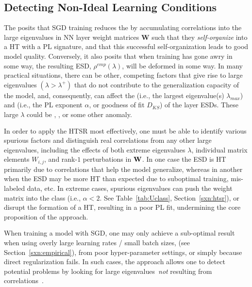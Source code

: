 \subsection{Detecting Non-Ideal Learning Conditions}
\label{sxn:HT_ESDs}


The \HTSR \Phenomenology posits that SGD training reduces the \emph{\TrainingError} by accumulating correlations into the large eigenvalues
in NN layer weight matrices  $\mathbf{W}$ such that they \emph{self-organize} into a HT with a PL signature,
and that this successful self-organization leads to good model quality.
Conversely, it also posits that when training has gone awry in some way, the resulting ESD, $\rho^{emp}(\lambda)$, will
be deformed in some way.   
In many practical situations, there can be other, 
competing factors that give rise to large eigenvalues $(\lambda>\lambda^{+})$
that do not contribute to the generalization capacity of the model, and, consequently, 
can affect the \Scale (i.e., the largest eigenvalue(s) $\lambda_{max}$) 
and \Shape (i.e., the PL exponent $\alpha$, or goodness of fit $D_{KS}$) of the layer ESDs.
These large $\lambda$ could be \DragonKings, \emph{\CorrelationTraps}, or some other anomaly.

In order to apply the HTSR \Phenomenology most effectively, one must be able to identify various spurious factors and
distinguish real correlations from any other large eigenvalues, including the effects of both
extreme eigenvalues $\lambda$, individual matrix elements $W_{i,j}$, and rank-$1$ perturbations in ${\mathbf{W}}$.
In one case the ESD is HT primarily due to correlations that help the model generalize, whereas
in another when the ESD may be more HT than expected due to suboptimal training, mis-labeled data, etc.
In extreme cases, spurious eigenvalues can push the weight matrix
into the \VeryHeavyTailed \Universality class (i.e., $\alpha<2$. See Table~\ref{tab:Uclass}, Section~\ref{sxn:htsr}), or
disrupt the formation of a HT, resulting in a poor PL fit, undermining the core proposition of the  \HTSR approach.

When training a model with SGD, one may only achieve  a sub-optimal result
when using overly large learning rates / small batch sizes, (see Section~\ref{sxn:empirical}),
from poor hyper-parameter settings,
or simply because direct regularization fails. In such cases, the \HTSR approach allows one to detect
potential problems by looking for large eigenvalues~\emph{not} resulting from correlations~\cite{GSZ20_TR}.

